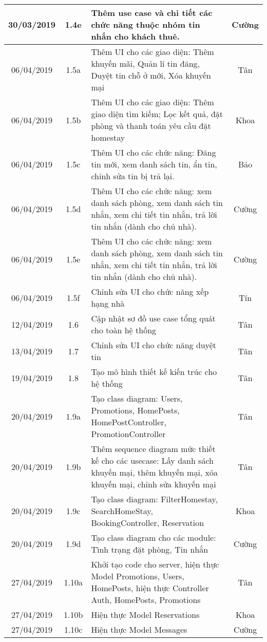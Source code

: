 \begin{center}
\begin{longtable}{ | c | c | p{5cm} |c|}
		30/03/2019 & 1.4e & Thêm use case và chi tiết các chức năng thuộc nhóm tin nhắn cho khách thuê. & Cường \\ \hline
		
		06/04/2019 & 1.5a & Thêm UI cho các giao diện: Thêm khuyến mãi, Quản lí tin đăng, Duyệt tin chỗ ở mới, Xóa khuyến mại & Tân \\ \hline 
		06/04/2019 & 1.5b & Thêm UI cho các giao diện: Thêm giao diện tìm kiếm; Lọc kết quả, đặt phòng và thanh toán yêu cầu đặt homestay & Khoa \\ \hline
		06/04/2019 & 1.5c & Thêm UI cho các chức năng: Đăng tin mới, xem danh sách tin, ẩn tin, chỉnh sửa tin bị trả lại. & Bảo \\ \hline
		06/04/2019 & 1.5d & Thêm UI cho các chức năng: xem danh sách phòng, xem danh sách tin nhắn, xem chi tiết tin nhắn, trả lời tin nhắn (dành cho chủ nhà). & Cường \\ \hline
		06/04/2019 & 1.5e & Thêm UI cho các chức năng: xem danh sách phòng, xem danh sách tin nhắn, xem chi tiết tin nhắn, trả lời tin nhắn (dành cho chủ nhà). & Cường \\ \hline
		06/04/2019 & 1.5f & Chỉnh sửa UI cho chức năng xếp hạng nhà & Tín \\ \hline
		12/04/2019 & 1.6 & Cập nhật sơ đồ use case tổng quát cho toàn hệ thống & Tân \\ \hline
		13/04/2019 & 1.7 & Chỉnh sửa UI cho chức năng duyệt tin & Tân \\ \hline
		19/04/2019 & 1.8 & Tạo mô hình thiết kế kiến trúc cho hệ thống & Tân \\ \hline
		20/04/2019 & 1.9a & Tạo class diagram: Users, Promotions, HomePosts, HomePostController, PromotionController & Tân \\ \hline
		20/04/2019 & 1.9b & Thêm sequence diagram mức thiết kế cho các usecase: Lấy danh sách khuyến mại, thêm khuyến mại, xóa khuyến mại, chỉnh sửa khuyến mại & Tân \\ \hline
		20/04/2019 & 1.9c & Tạo class diagram: FilterHomestay, SearchHomeStay, BookingController, Reservation & Khoa \\ \hline
		20/04/2019 & 1.9d & Tạo class diagram cho các module: Tình trạng đặt phòng, Tin nhắn & Cường \\ \hline
		27/04/2019 & 1.10a & Khởi tạo code cho server, hiện thực Model Promotions, Users, HomePosts, hiện thực Controller Auth, HomePosts, Promotions  & Tân \\ \hline
		27/04/2019 & 1.10b & Hiện thực Model Reservations  & Khoa \\ \hline
		27/04/2019 & 1.10c & Hiện thực Model Messages  & Cường \\ \hline
		\end{longtable}
\end{center}